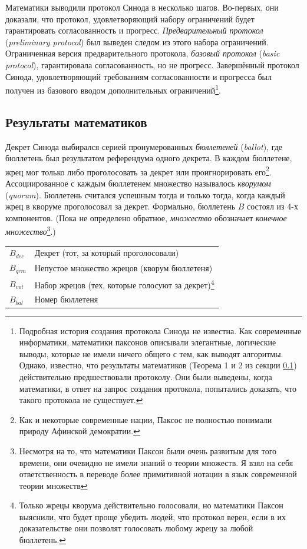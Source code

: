 \documentclass[12pt, a4paper]{article} %
\begin{document}
Математики выводили протокол Синода в несколько шагов. Во-первых, они доказали, что протокол, удовлетворяющий набору ограничений будет гарантировать согласованность  и прогресс. \textit{Предварительный протокол} (\textit{preliminary protocol}) был выведен следом из этого набора ограничений. Ограниченная  версия предварительного протокола, \textit{базовый протокол} (\textit{basic protocol}), гарантировала согласованность, но не прогресс. Завершённый протокол Синода, удовлетворяющий требованиям согласованности и прогресса был получен из базового вводом дополнительных ограничений\footnote{Подробная история создания протокола Синода не известна. Как современные информатики, математики паксонов описывали элегантные, логические выводы, которые не имели ничего общего с тем, как выводят алгоритмы. Однако, известно, что результаты математиков (Теорема 1 и 2 из секции \ref{sec:mathsupport}) действительно предшествовали протоколу. Они были выведены, когда математики, в ответ на запрос создания протокола, попытались доказать, что такого протокола не существует.
}.

\subsection{Результаты математиков}\label{sec:mathsupport}

Декрет Синода выбирался серией пронумерованных \textit{бюллетеней} (\textit{ballot}), где бюллетень был результатом референдума одного декрета. В каждом бюллетене, жрец мог только либо проголосовать за декрет или проигнорировать его\footnote{Как и некоторые современные нации, Паксос не полностью понимали природу Афинской демократии.}. Ассоциированное с каждым бюллетенем множество называлось \textit{кворумом} (\textit{quorum}). Бюллетень считался успешным тогда и только тогда, когда каждый жрец в кворуме проголосовал за декрет.  Формально, бюллетень $B$ состоял из 4-х компонентов. (Пока не определено обратное, \textit{множество} обозначает \textit{конечное множество}\footnote{Несмотря на то, что математики Паксон были очень развитым для того времени, они очевидно не имели знаний о теории множеств. Я взял на себя ответственность в переводе более примитивной нотации в язык современной теории множеств}.)
\begin{table}[h]
\begin{tabular}{ l p{10.5cm}}
    $B_{dec}$ & Декрет (тот, за который проголосовали)\\
    $B_{qrm}$ & Непустое множество жрецов (кворум бюллетеня)\\
    $B_{vot}$ & Набор жрецов (тех, которые голосуют за декрет)\footnote{Только жрецы кворума действительно голосовали, но математики Паксон выяснили, что будет проще убедить людей, что протокол верен, если в их доказательстве они позволят голосовать любому жрецу за любой бюллетень.}\\
    $B_{bal}$ & Номер бюллетеня
\end{tabular}
\end{table}
\end{document}
